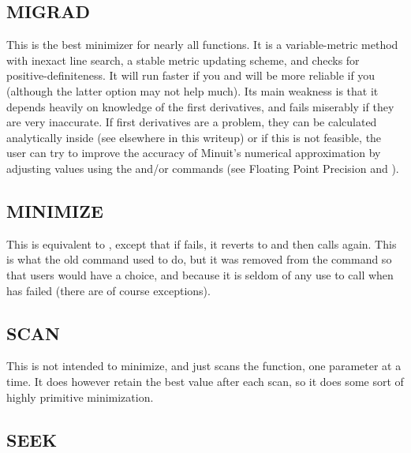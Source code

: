 \subsection{MIGRAD}

This is the best minimizer for nearly all functions. It is a
variable-metric method with inexact line search, a stable
metric updating scheme, and checks for positive-definiteness.
It will run faster if you 
and will be more reliable if you 
(although the latter option may not help much).
Its main weakness is that it depends heavily on knowledge of the
first derivatives, and fails miserably if they are very inaccurate.
If first derivatives are a problem, they can be
calculated analytically inside  (see elsewhere in this writeup) or
if this is not feasible, the user can try to improve the accuracy of
Minuit's numerical approximation by adjusting values using the
 and/or  commands
(see Floating Point Precision and ).

\subsection{MINIMIZE}

This is equivalent to , 
except that if  fails,
it reverts to  and then calls 
 again.
This is what the old  command used to do, 
but it was removed from
the  command so that users would have a choice, 
and because it is
seldom of any use to call  when 
 has failed (there are of course exceptions).

\subsection{SCAN}

This is not intended to minimize, and just scans the function, one
parameter at a time.
It does however retain the best value after each scan,
so it does some sort of highly primitive minimization.

\subsection{SEEK}


